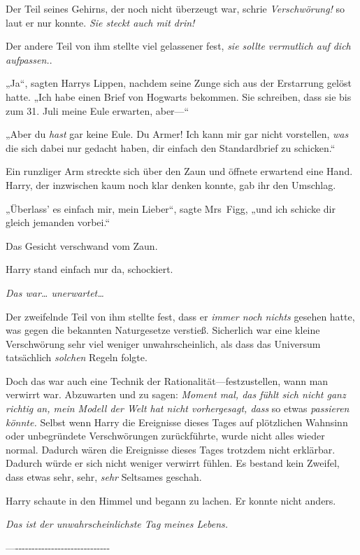 {Der Teil seines Gehirns, der noch nicht überzeugt war, schrie \emph{Verschwörung!} so laut er nur konnte. \emph{Sie steckt auch mit drin!}

Der andere Teil von ihm stellte viel gelassener fest, \emph{sie sollte vermutlich auf dich aufpassen.}.

„Ja“, sagten Harrys Lippen, nachdem seine Zunge sich aus der Erstarrung gelöst hatte. „Ich habe einen Brief von Hogwarts bekommen. Sie schreiben, dass sie bis zum 31. Juli meine Eule erwarten, aber—“

„Aber du \emph{hast} gar keine Eule. Du Armer! Ich kann mir gar nicht vorstellen, \emph{was} die sich dabei nur gedacht haben, dir einfach den Standardbrief zu schicken.“

Ein runzliger Arm streckte sich über den Zaun und öffnete erwartend eine Hand. Harry, der inzwischen kaum noch klar denken konnte, gab ihr den Umschlag.

„Überlass' es einfach mir, mein Lieber“, sagte Mrs~Figg, „und ich schicke dir gleich jemanden vorbei.“

Das Gesicht verschwand vom Zaun.

Harry stand einfach nur da, schockiert.

\emph{Das war… unerwartet…}

Der zweifelnde Teil von ihm stellte fest, dass er \emph{immer noch nichts} gesehen hatte, was gegen die bekannten Naturgesetze verstieß. Sicherlich war eine kleine Verschwörung sehr viel weniger unwahrscheinlich, als dass das Universum tatsächlich \emph{solchen} Regeln folgte.

Doch das war auch eine Technik der Rationalität—festzustellen, wann man verwirrt war. Abzuwarten und zu sagen: \emph{Moment mal, das fühlt sich nicht ganz richtig an, mein Modell der Welt hat nicht vorhergesagt, dass} so etwas \emph{passieren könnte.} Selbst wenn Harry die Ereignisse dieses Tages auf plötzlichen Wahnsinn oder unbegründete Verschwörungen zurückführte, wurde nicht alles wieder normal. Dadurch wären die Ereignisse dieses Tages trotzdem nicht erklärbar. Dadurch würde er sich nicht weniger verwirrt fühlen. Es bestand kein Zweifel, dass etwas sehr, sehr, \emph{sehr} Seltsames geschah.

Harry schaute in den Himmel und begann zu lachen. Er konnte nicht anders.

\emph{Das ist der unwahrscheinlichste Tag meines Lebens.}

—\/-\/-\/-\/-\/-\/-\/-\/-\/-\/-\/-\/-\/-\/-\/-\/-\/-\/-\/-\/-\/-\/-\/-\/-\/-\/-\/-\/-\/-

}
